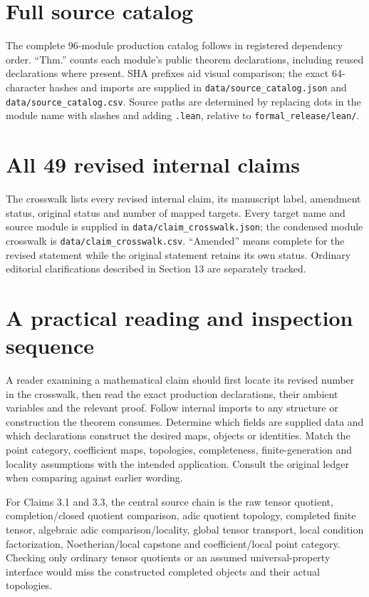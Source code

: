 \documentclass[11pt]{article}
\newcommand{\code}[1]{\nolinkurl{#1}}
\begin{document}
\appendix
\section{Full source catalog}
The complete 96-module production catalog follows in registered dependency order. ``Thm.'' counts each module's public theorem declarations, including reused declarations where present. SHA prefixes aid visual comparison; the exact 64-character hashes and imports are supplied in \code{data/source_catalog.json} and \code{data/source_catalog.csv}. Source paths are determined by replacing dots in the module name with slashes and adding \code{.lean}, relative to \code{formal_release/lean/}.
{\small}

\section{All 49 revised internal claims}
The crosswalk lists every revised internal claim, its manuscript label, amendment status, original status and number of mapped targets. Every target name and source module is supplied in \code{data/claim_crosswalk.json}; the condensed module crosswalk is \code{data/claim_crosswalk.csv}. ``Amended'' means complete for the revised statement while the original statement retains its own status. Ordinary editorial clarifications described in Section 13 are separately tracked.
{\small}

\section{A practical reading and inspection sequence}
A reader examining a mathematical claim should first locate its revised number in the crosswalk, then read the exact production declarations, their ambient variables and the relevant proof. Follow internal imports to any structure or construction the theorem consumes. Determine which fields are supplied data and which declarations construct the desired maps, objects or identities. Match the point category, coefficient maps, topologies, completeness, finite-generation and locality assumptions with the intended application. Consult the original ledger when comparing against earlier wording.

For Claims 3.1 and 3.3, the central source chain is the raw tensor quotient, completion/closed quotient comparison, adic quotient topology, completed finite tensor, algebraic adic comparison/locality, global tensor transport, local condition factorization, Noetherian/local capstone and coefficient/local point category. Checking only ordinary tensor quotients or an assumed universal-property interface would miss the constructed completed objects and their actual topologies.
\end{document}
